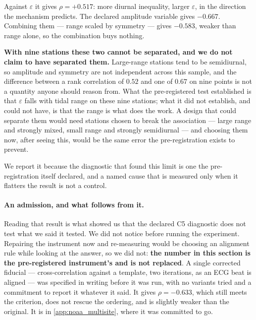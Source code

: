 \documentclass[10pt]{article}
\theoremstyle{plain}
\theoremstyle{definition}
\theoremstyle{remark}
\begin{document}
Against $\varepsilon$ it gives $\rho = +0.517$: more diurnal inequality, larger
$\varepsilon$, in the direction the mechanism predicts. The declared amplitude
variable gives $-0.667$. Combining them --- range scaled by symmetry --- gives
$-0.583$, weaker than range alone, so the combination buys nothing.

\textbf{With nine stations these two cannot be separated, and we do not claim
to have separated them.} Large-range stations tend to be semidiurnal, so
amplitude and symmetry are not independent across this sample, and the
difference between a rank correlation of $0.52$ and one of $0.67$ on nine
points is not a quantity anyone should reason from. What the pre-registered
test established is that $\varepsilon$ falls with tidal range on these nine
stations; what it did not establish, and could not have, is that the range is
what does the work. A design that could separate them would need stations
chosen to break the association --- large range and strongly mixed, small range
and strongly semidiurnal --- and choosing them now, after seeing this, would be
the same error the pre-registration exists to prevent.

We report it because the diagnostic that found this limit is one the
pre-registration itself declared, and a named cause that is measured only when
it flatters the result is not a control.

\paragraph{An admission, and what follows from it.}
Reading that result is what showed us that the declared C5 diagnostic does not
test what we said it tested. We did not notice before running the experiment.
Repairing the instrument now and re-measuring would be choosing an alignment
rule while looking at the answer, so we did not: \textbf{the number in this
section is the pre-registered instrument's and is not replaced}. A single
corrected fiducial --- cross-correlation against a template, two iterations, as
an ECG beat is aligned --- was specified in writing before it was run, with no
variants tried and a commitment to report it whatever it said. It gives
$\rho = -0.633$, which still meets the criterion, does not rescue the ordering,
and is slightly weaker than the original. It is in
\ref{app:noaa_multisite}, where it was committed to go.
\end{document}
